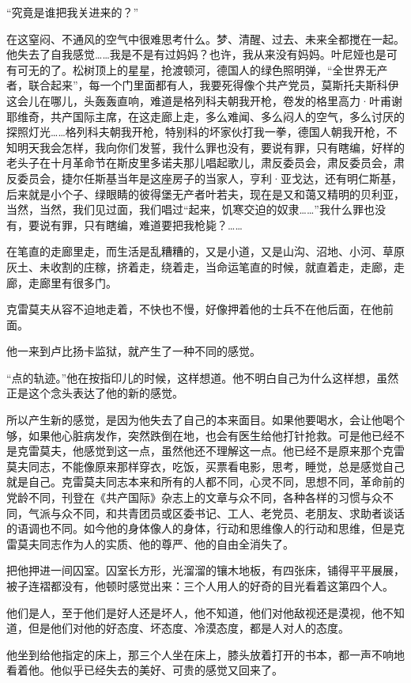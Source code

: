 “究竟是谁把我关进来的？”

在这窒闷、不通风的空气中很难思考什么。梦、清醒、过去、未来全都搅在一起。他失去了自我感觉……我是不是有过妈妈？也许，我从来没有妈妈。叶尼娅也是可有可无的了。松树顶上的星星，抢渡顿河，德国人的绿色照明弹，“全世界无产者，联合起来”，每一个门里面都有人，我要死得像个共产党员，莫斯托夫斯科伊这会儿在哪儿，头轰轰直响，难道是格列科夫朝我开枪，卷发的格里高力·叶甫谢耶维奇，共产国际主席，在这走廊上走，多么难闻、多么闷人的空气，多么讨厌的探照灯光……格列科夫朝我开枪，特别科的坏家伙打我一拳，德国人朝我开枪，不知明天我会怎样，我向你们发誓，我什么罪也没有，要说有罪，只有瞎编，好样的老头子在十月革命节在斯皮里多诺夫那儿唱起歌儿，肃反委员会，肃反委员会，肃反委员会，捷尔任斯基当年是这座房子的当家人，亨利·亚戈达，还有明仁斯基，后来就是小个子、绿眼睛的彼得堡无产者叶若夫，现在是又和蔼又精明的贝利亚，当然，当然，我们见过面，我们唱过“起来，饥寒交迫的奴隶……”我什么罪也没有，要说有罪，只有瞎编，难道要把我枪毙？……

在笔直的走廊里走，而生活是乱糟糟的，又是小道，又是山沟、沼地、小河、草原灰土、未收割的庄稼，挤着走，绕着走，当命运笔直的时候，就直着走，走廊，走廊，走廊里有很多门。

克雷莫夫从容不迫地走着，不快也不慢，好像押着他的士兵不在他后面，在他前面。

他一来到卢比扬卡监狱，就产生了一种不同的感觉。

“点的轨迹。”他在按指印儿的时候，这样想道。他不明白自己为什么这样想，虽然正是这个念头表达了他的新的感觉。

所以产生新的感觉，是因为他失去了自己的本来面目。如果他要喝水，会让他喝个够，如果他心脏病发作，突然跌倒在地，也会有医生给他打针抢救。可是他已经不是克雷莫夫，他感觉到这一点，虽然他还不理解这一点。他已经不是原来那个克雷莫夫同志，不能像原来那样穿衣，吃饭，买票看电影，思考，睡觉，总是感觉自己就是自己。克雷莫夫同志本来和所有的人都不同，心灵不同，思想不同，革命前的党龄不同，刊登在《共产国际》杂志上的文章与众不同，各种各样的习惯与众不同，气派与众不同，和共青团员或区委书记、工人、老党员、老朋友、求助者谈话的语调也不同。如今他的身体像人的身体，行动和思维像人的行动和思维，但是克雷莫夫同志作为人的实质、他的尊严、他的自由全消失了。

把他押进一间囚室。囚室长方形，光溜溜的镶木地板，有四张床，铺得平平展展，被子连褶都没有，他顿时感觉出来：三个人用人的好奇的目光看着这第四个人。

他们是人，至于他们是好人还是坏人，他不知道，他们对他敌视还是漠视，他不知道，但是他们对他的好态度、坏态度、冷漠态度，都是人对人的态度。

他坐到给他指定的床上，那三个人坐在床上，膝头放着打开的书本，都一声不响地看着他。他似乎已经失去的美好、可贵的感觉又回来了。

